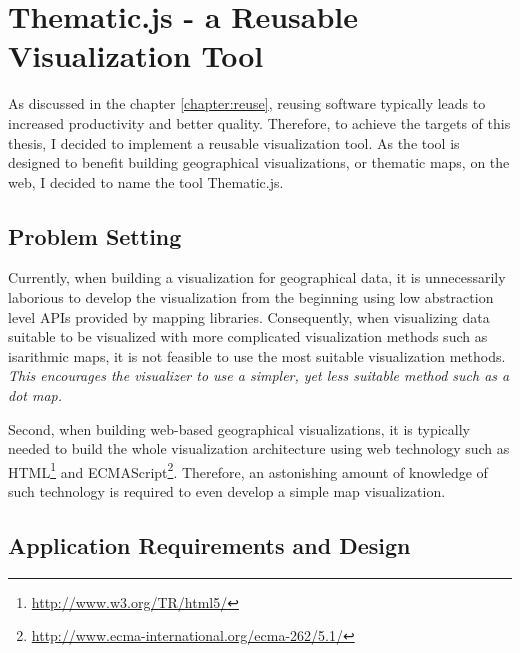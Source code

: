 
\chapter{Thematic.js - a Reusable Visualization Tool}
\label{chapter:implementation}




As discussed in the chapter \ref{chapter:reuse}, reusing software typically leads to increased productivity and better quality. Therefore, to achieve the targets of this thesis, I decided to implement a reusable visualization tool. As the tool is designed to benefit building geographical visualizations, or thematic maps, on the web, I decided to name the tool Thematic.js.

\section{Problem Setting}

Currently, when building a visualization for geographical data, it is unnecessarily laborious to develop the visualization from the beginning using low abstraction level APIs provided by mapping libraries. Consequently, when visualizing data suitable to be visualized with more complicated visualization methods such as isarithmic maps, it is not feasible to use the most suitable visualization methods. \emph{This encourages the visualizer to use a simpler, yet less suitable method such as a dot map.}

Second, when building web-based geographical visualizations, it is typically needed to build the whole visualization architecture using web technology such as HTML\footnote{\url{http://www.w3.org/TR/html5/}} and ECMAScript\footnote{\url{http://www.ecma-international.org/ecma-262/5.1/}}. Therefore, an astonishing amount of knowledge of such technology is required to even develop a simple map visualization. 

\section{Application Requirements and Design}
\label{section:requirements}

